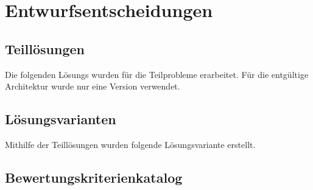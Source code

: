\chapter{Entwurfsentscheidungen}

\section{Teillösungen}

Die folgenden Lösungs wurden für die Teilprobleme erarbeitet. Für die entgültige Architektur wurde nur eine Version verwendet.

\section{Lösungsvarianten}

Mithilfe der Teillösungen wurden folgende Lösungsvariante erstellt. 

\section{Bewertungskriterienkatalog}


